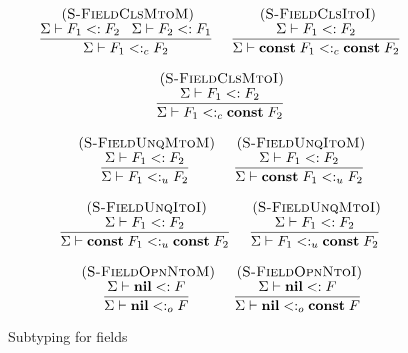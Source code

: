 \documentclass[10pt]{sigplanconf}
\newcommand{\Nil}{\mathbf{nil}}
\newcommand{\Const}{\mathbf{const}}
\newcommand{\mylabel}[1]{\; (\textsc{#1})}
\newcommand{\senv}{\Sigma}
\newcommand{\subtype}{<:}
\begin{document}
\begin{figure}[t]
{\footnotesize
\[
\begin{array}{c}
\begin{array}{c}
\mylabel{S-FieldClsMtoM}\\
\dfrac{\senv \vdash F_{1} \subtype F_{2} \;\;\;
	\senv \vdash F_{2} \subtype F_{1}}
{\senv \vdash F_{1} \subtype_{c} F_{2}}
\end{array}
\;
\begin{array}{c}
\mylabel{S-FieldClsItoI}\\
\dfrac{\senv \vdash F_{1} \subtype F_{2}}
{\senv \vdash \Const \; F_{1} \subtype_{c} \Const \; F_{2}}
\end{array}
\\ \\
\begin{array}{c}
\mylabel{S-FieldClsMtoI}\\
\dfrac{\senv \vdash F_{1} \subtype F_{2}}
{\senv \vdash F_{1} \subtype_{c} \Const \; F_{2}}
\end{array}\\\\
\begin{array}{c}
\mylabel{S-FieldUnqMtoM}\\
\dfrac{\senv \vdash F_{1} \subtype F_{2}}
{\senv \vdash F_{1} \subtype_{u} F_{2}}
\end{array}
\;
\begin{array}{c}
\mylabel{S-FieldUnqItoM}\\
\dfrac{\senv \vdash F_{1} \subtype F_{2}}
{\senv \vdash \Const \; F_{1} \subtype_{u} F_{2}}
\end{array}
\\ \\
\begin{array}{c}
\mylabel{S-FieldUnqItoI}\\
\dfrac{\senv \vdash F_{1} \subtype F_{2}}
{\senv \vdash \Const \; F_{1} \subtype_{u} \Const \; F_{2}}
\end{array}
\;
\begin{array}{c}
\mylabel{S-FieldUnqMtoI}\\
\dfrac{\senv \vdash F_{1} \subtype F_{2}}
{\senv \vdash F_{1} \subtype_{u} \Const \; F_{2}}
\end{array}
\\ \\
\begin{array}{c}
\mylabel{S-FieldOpnNtoM}\\
\dfrac{\senv \vdash \Nil \subtype F}
{\senv \vdash \Nil \subtype_{o} F}
\end{array}
\;
\begin{array}{c}
\mylabel{S-FieldOpnNtoI}\\
\dfrac{\senv \vdash \Nil \subtype F}
{\senv \vdash \Nil \subtype_{o} \Const \; F}
\end{array}
\end{array}
\]
}
\caption{Subtyping for fields}
\label{fig:subfield}
\end{figure}
\end{document}
